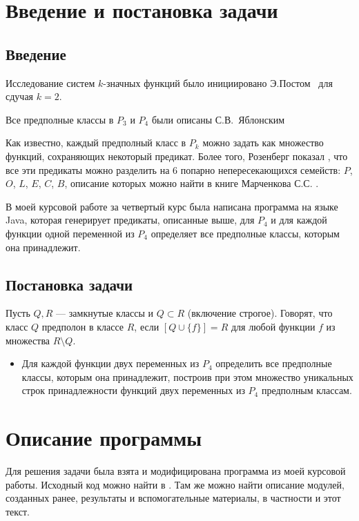 \documentclass[a4paper,14pt]{extreport}
\begin{document}
\newpage
\tableofcontents
\newpage
\chapter{ Введение и постановка задачи }

\section{Введение}
Исследование систем $k$-значных функций было инициировано Э.Постом~\cite{post1,post2} для сдучая $k=2$.

Все предполные классы в $P_3$ и $P_4$ были описаны С.В.~Яблонским\cite{yabl}

Как известно, каждый предполный класс в $P_k$ можно задать как множество функций, сохраняющих некоторый предикат. Более того, Розенберг показал \cite{roz1, roz2}, что все эти предикаты можно разделить на 6 попарно непересекающихся семейств: $P$, $O$, $L$, $E$, $C$, $B$, описание которых можно найти в книге Марченкова С.С. \cite{march}. 

В моей курсовой работе за четвертый курс была написана программа на языке Java, которая генерирует предикаты, описанные выше, для $P_4$ и для каждой функции одной переменной из $P_4$ определяет все предполные классы, которым она принадлежит.

\section{Постановка задачи}
Пусть $Q, R$ — замкнутые классы и $Q \subset R$ (включение строгое). 
Говорят, что класс $Q$ предполон в классе $R$, если $[Q \cup \{f\}] = R$ для 
любой функции $f$ из множества $R \setminus Q$. 

\begin{itemize}
\item Для каждой функции двух переменных из $P_4$ определить все предполные классы, которым она принадлежит, построив при этом множество уникальных строк принадлежности функций двух переменных из $P_4$ предполным классам.
\end{itemize}

\newpage
\chapter{Описание программы}
Для решения задачи была взята и модифицирована программа из моей курсовой работы. Исходный код можно найти в \cite{git}. Там же можно найти описание модулей, созданных ранее, результаты и вспомогательные материалы, в частности и этот текст.
\end{document}
